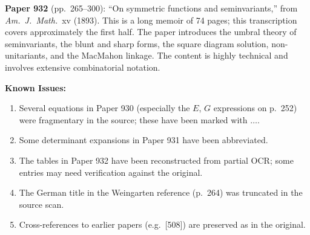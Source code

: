 \documentclass[11pt,a4paper]{article}
\begin{document}
\textbf{Paper 932} (pp.\ 265--300): ``On symmetric functions and seminvariants,''
from \textit{Am.\ J.\ Math.}\ xv (1893). This is a long memoir of 74 pages;
this transcription covers approximately the first half. The paper introduces
the umbral theory of seminvariants, the blunt and sharp forms, the square
diagram solution, non-unitariants, and the MacMahon linkage. The content is
highly technical and involves extensive combinatorial notation.

\textbf{Known Issues:}
\begin{enumerate}
\item Several equations in Paper 930 (especially the $E$, $G$ expressions on p.\ 252)
were fragmentary in the source; these have been marked with $\ldots$.
\item Some determinant expansions in Paper 931 have been abbreviated.
\item The tables in Paper 932 have been reconstructed from partial OCR; some
entries may need verification against the original.
\item The German title in the Weingarten reference (p.\ 264) was truncated in
the source scan.
\item Cross-references to earlier papers (e.g.\ [508]) are preserved as in the original.
\end{enumerate}
\end{document}

